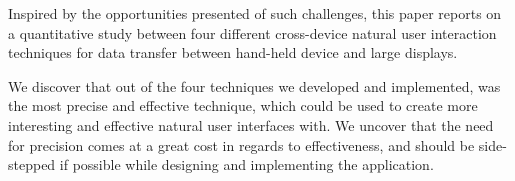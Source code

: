 Inspired by the opportunities presented of such challenges, this paper reports on a quantitative study between four different cross-device natural user interaction techniques for data transfer between hand-held device and large displays.

We discover that out of the four techniques we developed and implemented, \swipe was the most precise and effective technique, which could be used to create more interesting and effective natural user interfaces with. We uncover that the need for precision comes at a great cost in regards to effectiveness, and should be side-stepped if possible while designing and implementing the application.  

